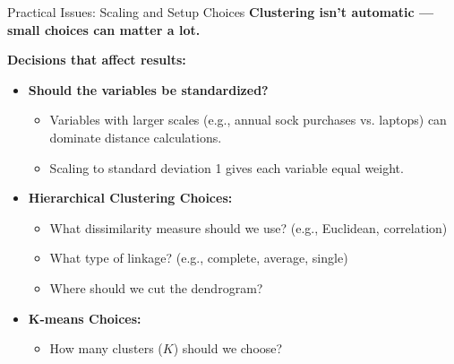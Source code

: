 \documentclass[aspectratio=169,xcolor=dvipsnames]{beamer}
\begin{document}
\begin{frame}{Practical Issues: Scaling and Setup Choices}
  \textbf{Clustering isn't automatic — small choices can matter a lot.}

  \vspace{0.3cm}
  \textbf{Decisions that affect results:}
  \begin{itemize}
    \item \textbf{Should the variables be standardized?}
    \begin{itemize}
      \item Variables with larger scales (e.g., annual sock purchases vs. laptops) can dominate distance calculations.
      \item Scaling to standard deviation 1 gives each variable equal weight.
    \end{itemize}

    \item \textbf{Hierarchical Clustering Choices:}
    \begin{itemize}
      \item What dissimilarity measure should we use? (e.g., Euclidean, correlation)
      \item What type of linkage? (e.g., complete, average, single)
      \item Where should we cut the dendrogram?
    \end{itemize}

    \item \textbf{K-means Choices:}
    \begin{itemize}
      \item How many clusters ($K$) should we choose?
    \end{itemize}
  \end{itemize}
\end{frame}
\end{document}
